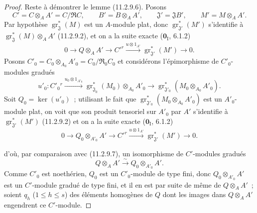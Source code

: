 \begin{proof}
Reste à démontrer le lemme (11.2.9.6). Posons
\[
C'=C\otimes_AA'=C/\mathfrak RC,\qquad
B'=B\otimes_AA',\qquad \mathfrak J'=\mathfrak JB',\qquad
M'=M\otimes_AA'.
\]
Par hypothèse $\operatorname{gr}_{\mathfrak J}^*(M)$ est un $A$-module plat,
donc $\operatorname{gr}_{\mathfrak J'}^*(M')$ s'identifie à
$\operatorname{gr}_{\mathfrak J}^*(M)\otimes_AA'$ (11.2.9.2), et on a la
suite exacte ($\mathbf 0_{\mathrm I}$, 6.1.2)
\begin{equation}
0\longrightarrow Q\otimes_AA'\longrightarrow C'^{r}
\xrightarrow{u\otimes1_{A'}}\operatorname{gr}_{\mathfrak J'}^*(M')
\longrightarrow0.
\label{IV.11.2.9.7-fr}
\tag{11.2.9.7}
\end{equation}
Posons $C'_0=C_0\otimes_{A_0}A'_0=C_0/\mathfrak R_0C_0$ et considérons
l'épimorphisme de $C'_0$-modules gradués
\[
u'_0:C'_0{}^{r}\xrightarrow{u_0\otimes1_{A'_0}}
\operatorname{gr}_{\mathfrak J_0}^*(M_0)\otimes_{A_0}A'_0
\longrightarrow
\operatorname{gr}_{\mathfrak J'_0}^*(M_0\otimes_{A_0}A'_0).
\]
Soit $Q_0=\ker(u'_0)$~; utilisant le fait que
$\operatorname{gr}_{\mathfrak J'_0}^*(M_0\otimes_{A_0}A'_0)$ est un
$A'_0$-module plat, on voit que son produit tensoriel sur $A'_0$ par $A'$
s'identifie à $\operatorname{gr}_{\mathfrak J'}^*(M')$ (11.2.9.2) et on a la
suite exacte ($\mathbf 0_{\mathrm I}$, 6.1.2)
\begin{equation}
0\longrightarrow Q_0\otimes_{A'_0}A'\longrightarrow C'^{r}
\xrightarrow{u\otimes1_{A'}}\operatorname{gr}_{\mathfrak J'}^*(M')
\longrightarrow0.
\label{IV.11.2.9.8-fr}
\tag{11.2.9.8}
\end{equation}


d'où, par comparaison avec (11.2.9.7), un isomorphisme de $C'$-modules
gradués
\[
Q\otimes_AA'\xrightarrow{\sim}Q_0\otimes_{A'_0}A'.
\]
Comme $C'_0$ est noethérien, $Q_0$ est un $C'_0$-module de type fini, donc
$Q_0\otimes_{A'_0}A'$ est un $C'$-module gradué de type fini, et il en est par
suite de même de $Q\otimes_AA'$~; soient $q_h$ ($1\leq h\leq s$) des éléments
homogènes de $Q$ dont les images dans $Q\otimes_AA'$ engendrent ce
$C'$-module.


\end{proof}
